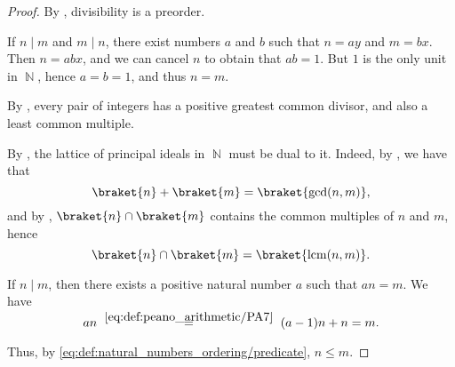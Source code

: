 \begin{proof}
  By , divisibility is a preorder.

   If \( n \mid m \) and \( m \mid n \), there exist numbers \( a \) and \( b \) such that \( n = ay \) and \( m = bx \). Then \( n = abx \), and we can cancel \( n \) to obtain that \( ab = 1 \). But \( 1 \) is the only unit in \( \BbbN \), hence \( a = b = 1 \), and thus \( n = m \).

   By , every pair of integers has a positive greatest common divisor, and also a least common multiple.

  By , the lattice of principal ideals in \( \BbbN \) must be dual to it. Indeed, by , we have that
  \begin{equation*}
    \braket{n} + \braket{m} = \braket{ \gcd(n, m) },
  \end{equation*}
  and by , \( \braket{n} \cap \braket{m} \) contains the common multiples of \( n \) and \( m \), hence
  \begin{equation*}
    \braket{n} \cap \braket{m} = \braket{ \lcm(n, m) }.
  \end{equation*}

   If \( n \mid m \), then there exists a positive natural number \( a \) such that \( an = m \). We have
  \begin{equation*}
    an
    \reloset{\eqref{eq:def:peano_arithmetic/PA7}} =
    (a - 1)n + n
    =
    m.
  \end{equation*}

  Thus, by \eqref{eq:def:natural_numbers_ordering/predicate}, \( n \leq m \).
\end{proof}
